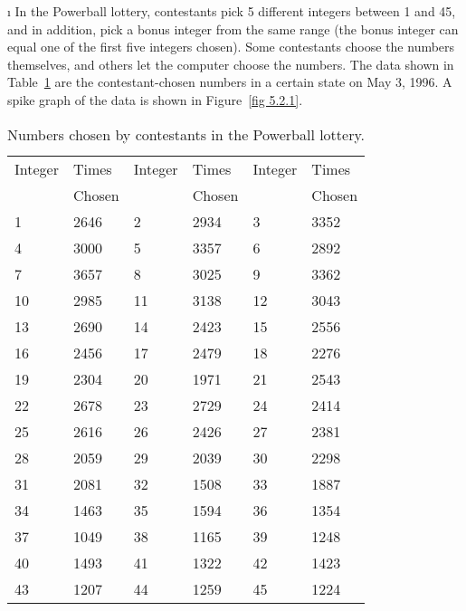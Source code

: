 \begin{LJSItem}
\i\label{exer 5.1.127} In the Powerball lottery,
contestants pick 5 different integers between 1 and 45, and in addition, pick a bonus integer from
the same range (the bonus integer can equal one of the first five integers chosen).  Some
contestants choose the numbers themselves, and others let the computer choose the numbers.  The data
shown in Table~\ref{table 5.10} are the contestant-chosen numbers in a certain state on May
3, 1996.  A spike graph of the data is shown in Figure~\ref{fig 5.2.1}.  
\par
{}

\begin{table}[h]
\centering
\begin{tabular}{llllll} Integer & Times & Integer & Times & Integer & Times\\
&Chosen && Chosen &&Chosen\\
\hline
1&2646&
2&2934&
3&3352\\
4&3000&
5&3357&
6&2892\\
7&3657&
8&3025&
9&3362\\
10&2985&
11&3138&
12&3043\\
13&2690&
14&2423&
15&2556\\
16&2456&
17&2479&
18&2276\\
19&2304&
20&1971&
21&2543\\
22&2678&
23&2729&
24&2414\\
25&2616&
26&2426&
27&2381\\
28&2059&
29&2039&
30&2298\\
31&2081&
32&1508&
33&1887\\
34&1463&
35&1594&
36&1354\\
37&1049&
38&1165&
39&1248\\
40&1493&
41&1322&
42&1423\\
43&1207&
44&1259&
45&1224\\
\end{tabular}
\caption{Numbers chosen by contestants in the Powerball lottery.}
\label{table 5.10}
\end{table}


\end{LJSItem}

